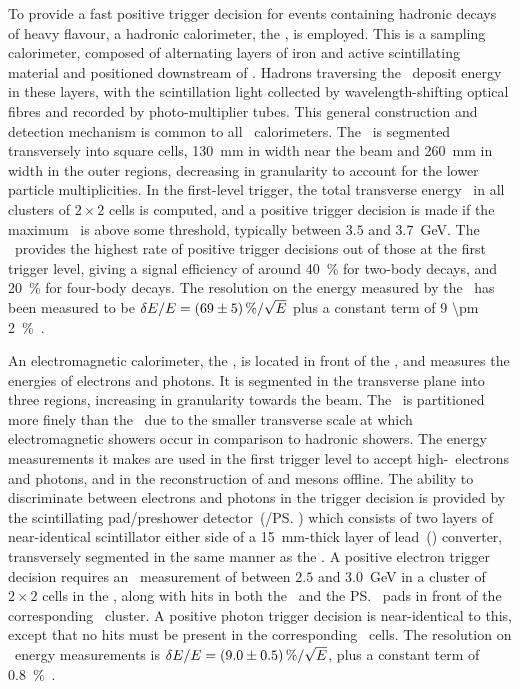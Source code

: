 To provide a fast positive trigger decision for events containing hadronic 
decays of heavy flavour, a hadronic calorimeter, the \hcal, is employed.
This is a sampling calorimeter, composed of alternating layers of iron and 
active scintillating material and positioned downstream of \richtwo.
Hadrons traversing the \hcal\ deposit energy in these layers, with the 
scintillation light collected by wavelength-shifting optical fibres and 
recorded by photo-multiplier tubes.
This general construction and detection mechanism is common to all \lhcb\ 
calorimeters.
The \hcal\ is segmented transversely into square cells, \SI{130}{\milli\metre} 
in width near the beam and \SI{260}{\milli\metre} in width in the outer 
regions, decreasing in granularity to account for the lower particle 
multiplicities.
In the first-level trigger, the total transverse energy \ET\ in all clusters of 
$2\times2$ cells is computed, and a positive trigger decision is made if the 
maximum \ET\ is above some threshold, typically between $3.5$ and 
\SI{3.7}{\GeV}.
The \hcal\ provides the highest rate of positive trigger decisions out of those 
at the first trigger level, giving a signal efficiency of around 
\SI{40}{\percent} for two-body \PB decays, and \SI{20}{\percent} for four-body 
\PD decays.
The resolution on the energy measured by the \hcal\ has been measured to be 
$\unc{E}/E = \SI{69 \pm 5}{\percent}/\sqrt{E}$ plus a constant term of \SI{9 
  \pm 2}{\percent}~\cite{Perret:2015pla}.

An electromagnetic calorimeter, the \ecal, is located in front of the \hcal, 
and measures the energies of electrons and photons.
It is segmented in the transverse plane into three regions, increasing in 
granularity towards the beam.
The \ecal\ is partitioned more finely than the \hcal\ due to the smaller 
transverse scale at which electromagnetic showers occur in comparison to 
hadronic showers.
The energy measurements it makes are used in the first trigger level to accept 
high-\ET\ electrons and photons, and in the reconstruction of \Ppizero and 
\Peta mesons offline.
The ability to discriminate between electrons and photons in the trigger 
decision is provided by the scintillating pad/preshower detector~(\spd/\ps) 
which consists of two layers of near-identical scintillator either side of a 
\SI{15}{\milli\metre}-thick layer of lead~(\ce{Pb}) converter, transversely 
segmented in the same manner as the \ecal.
A positive electron trigger decision requires an \ET\ measurement of between 
$2.5$ and \SI{3.0}{\GeV} in a cluster of $2\times2$ cells in the \ecal, along 
with hits in both the \spd\ and the \ps\ pads in front of the corresponding 
\ecal\ cluster.  A positive photon trigger decision is near-identical to this, 
except that no hits must be present in the corresponding \spd\ cells.
The resolution on \ecal\ energy measurements is $\unc{E}/E = \SI{9 \pm 
  0.5}{\percent}/\sqrt{E}$, plus a constant term of 
\SI{0.8}{\percent}~\cite{Perret:2015pla}.

